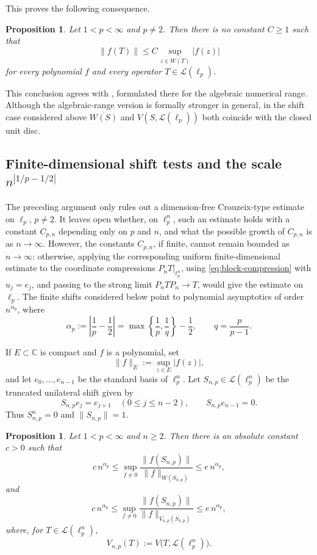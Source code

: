 \documentclass[11pt]{amsart}
\numberwithin{equation}{section}
\newtheorem{proposition}[theorem]{Proposition}
\theoremstyle{definition}
\theoremstyle{remark}
\newcommand{\C}{\mathbb{C}}
\begin{document}
This proves the following consequence.
\begin{proposition}\label{cor:no-crouzeix-lp}
Let $1<p<\infty$ and $p\neq2$.  Then there is no constant $C\ge1$ such that
\begin{equation}\label{crouz}
\|f(T)\|\le C\sup_{z\in \overline{W(T)}}|f(z)|
\end{equation}
for every polynomial $f$ and every operator $T\in \mathcal L(\ell_p)$.
\end{proposition}
This conclusion agrees with \cite[Theorem~6.1]{BHSVW2025}, formulated there for the algebraic numerical range. Although the algebraic-range version is formally stronger in general, in the shift case considered above \(\overline{W(S)}\) and \(V(S,\mathcal L(\ell_p))\) both coincide with the closed unit disc.




\subsection{Finite-dimensional shift tests and the scale $n^{|1/p-1/2|}$}

The preceding argument only rules out a dimension-free
Crouzeix-type estimate on \(\ell_p\), \(p\ne2\). It leaves open whether, on
\(\ell_p^n\), such an estimate holds with a constant \(C_{p,n}\) depending only
on \(p\) and \(n\), and what the possible growth of \(C_{p,n}\) is as
\(n\to\infty\). However, the constants \(C_{p,n}\), if finite, cannot remain
bounded as \(n\to\infty\): otherwise, applying the corresponding uniform
finite-dimensional estimate to the coordinate compressions \(P_nT|_{\ell_p^n}\),
using \eqref{eq:block-compression} with \(u_j=e_j\), and passing to the strong
limit \(P_nTP_n\to T\), would give the estimate on \(\ell_p\). The finite shifts
considered below point to polynomial asymptotics of order \(n^{\alpha_p}\), where
\[
\alpha_p:=\left|\frac1p-\frac12\right|
       =\max\left\{\frac1p,\frac1q\right\}-\frac12, \qquad q=\frac{p}{p-1}.
\]

 
If $E\subset\C$ is compact and $f$ is a polynomial, set
\[
\|f\|_E:=\sup_{z\in E}|f(z)|,
\]
and let $e_0,\ldots,e_{n-1}$ be the standard basis of $\ell_p^n$. Let
$S_{n,p} \in \mathcal L(\ell_p^n)$ be the truncated unilateral shift given by
\[
S_{n,p}e_j=e_{j+1}\quad(0\le j\le n-2),
\qquad
S_{n,p} e_{n-1}=0.
\]
Thus $S_{n,p}^n=0$ and $\|S_{n,p}\|=1$.

\begin{proposition}\label{prop:finite-shift-crouzeix-scale}
Let $1<p<\infty$ and $n\ge2$.  Then there is an absolute constant
$c>0$ such that
\[
c\,n^{\alpha_p}
\le
\sup_{f\ne0}\frac{\|f(S_{n,p})\|}{\|f\|_{W(S_{n,p})}}
\le
 e\,n^{\alpha_p},
\]
and
\[
c\,n^{\alpha_p}
\le
\sup_{f\ne0}\frac{\|f(S_{n,p})\|}{\|f\|_{V_{n,p}(S_{n,p})}}
\le
 e\,n^{\alpha_p},
\]
where, for $T\in\mathcal L(\ell_p^n)$,
\[
        V_{n,p}(T):=V\bigl(T,\mathcal L(\ell_p^n)\bigr).
\]
\end{proposition}
\end{document}
